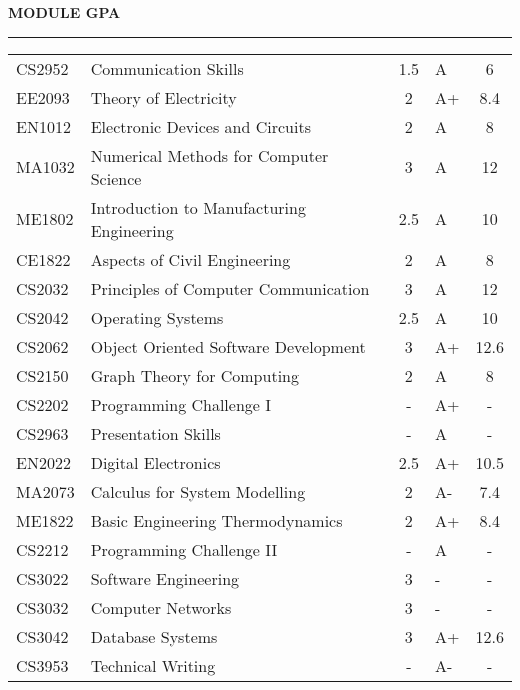 \documentclass{article}
\newenvironment{rSection}[1]{
    \sectionskip
    \MakeUppercase{\bf #1} 
    \sectionlineskip
    \hrule
    \begin{list}{}{ 
        \setlength{\leftmargin}{1.5em} 
    }
    \item[]
}{
    \end{list}
}
\def\sectionskip{\medskip}
\def\sectionlineskip{\medskip}
\begin{document}
\begin{rSection}{Module GPA}
\begin{tabularx}{\linewidth}{|l|X|c|l|c|}
    CS2952  &   Communication Skills	                    & 1.5   &    A  &      6    \\
    EE2093  &   Theory of Electricity	                    & 2     &    A+ &    8.4    \\
    EN1012  &   Electronic Devices and Circuits	            & 2     &    A  &      8    \\
    MA1032  &   Numerical Methods for Computer Science	    & 3     &    A  &     12    \\
    ME1802  &   Introduction to Manufacturing Engineering   & 2.5   &    A  &     10    \\
    \hline
    CE1822  &   Aspects of Civil Engineering	            & 2     &    A  &      8    \\
    CS2032  &   Principles of Computer Communication	    & 3     &    A  &     12    \\
    CS2042  &   Operating Systems	                        & 2.5   &    A  &     10    \\
    CS2062  &   Object Oriented Software Development	    & 3     &    A+ &   12.6    \\
    CS2150  &   Graph Theory for Computing	                & 2     &    A  &      8    \\
    CS2202  &   Programming Challenge I	                    & -     &    A+ &      -    \\
    CS2963  &   Presentation Skills	                        & -     &    A  &      -    \\
    EN2022  &   Digital Electronics	                        & 2.5   &    A+ &   10.5    \\
    MA2073  &   Calculus for System Modelling	            & 2     &    A- &    7.4    \\
    ME1822  &   Basic Engineering Thermodynamics	        & 2     &    A+ &    8.4    \\
    \hline
    CS2212  &   Programming Challenge II	                & -     &    A  &      -    \\
    CS3022  &   Software Engineering	                    & 3     &    -  &      -    \\
    CS3032  &   Computer Networks	                        & 3     &    -  &      -    \\
    CS3042  &   Database Systems	                        & 3     &    A+ &   12.6    \\
    CS3953  &   Technical Writing	                        & -     &    A- &      -    \\

\end{tabularx}
\end{rSection}
\end{document}
